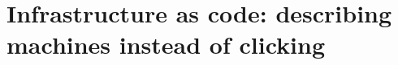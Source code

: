 \chapter{Infrastructure as code: describing machines instead of clicking}
\label{ch:infrastructure-as-code-describing}


